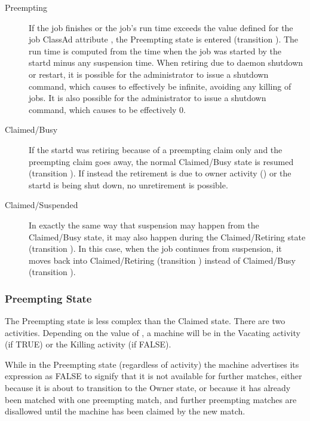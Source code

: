 \begin{description}

\item[Preempting] If the job finishes or the job's run time exceeds
the value defined for the job ClassAd attribute ,
the Preempting state is entered
(transition ).  The run time is computed from the time when the
job was started by the startd minus any suspension time.  When retiring
due to  daemon shutdown or restart,
it is possible for the administrator to issue a
 shutdown command, which causes 
to effectively be infinite, avoiding any killing of jobs.  It is also
possible for the administrator to issue a  shutdown command,
which causes
 to be effectively 0.

\item[Claimed/Busy] If the startd was retiring because of a preempting
claim only and the preempting claim goes away, the normal Claimed/Busy
state is resumed (transition ).  If instead the retirement
is due to owner activity () or the startd is being shut down,
no unretirement is possible.

\item[Claimed/Suspended] In exactly the same way that suspension may
happen from the Claimed/Busy state, it may also happen during the
Claimed/Retiring state (transition ).
In this case, when the job continues from suspension, it moves back
into Claimed/Retiring (transition ) instead of Claimed/Busy
(transition ).

\end{description}


\subsubsection{\label{sec:Preempting-State}Preempting State}

The Preempting state is less complex than the Claimed state.
There are two activities.
Depending on the value of , a machine will
be in the
Vacating activity (if TRUE) or the Killing activity (if FALSE).  

While in the Preempting state (regardless of activity) the machine
advertises its  expression as FALSE to signify that
it is not available for further matches, either because it is about to
transition
to the Owner state, or because it has already been matched with
one preempting match, and further preempting matches are disallowed
until the machine has been claimed by the new match.

